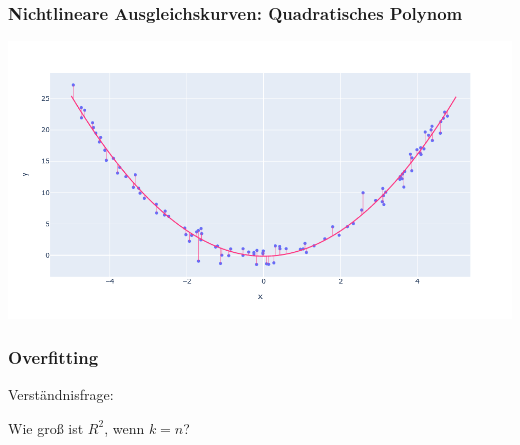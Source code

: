 \begin{frame}
\frametitle{Nichtlineare Ausgleichskurven: Quadratisches Polynom}

\begin{center}
\includegraphics[width=\textwidth]{fig8/squared-fit.png}
\end{center}

\end{frame}


\begin{frame}
\frametitle{Overfitting}

\vfill
\begin{center}
Verständnisfrage:
\vspace{1mm}

{\Large Wie groß ist $R^2$, wenn $k = n$?}
\end{center}
\vfill

\end{frame}



